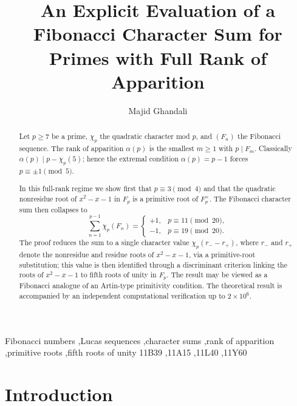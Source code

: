 \documentclass[preprint,5p,times,twocolumn]{elsarticle}
\def\F{F}\def\Z{Z}\def\Q{Q}\def\R{R}\def\N{N}%
\newcommand{\Z}{\mathbb{Z}}
\newcommand{\Q}{\mathbb{Q}}
\newcommand{\R}{\mathbb{R}}
\newcommand{\F}{\mathbb{F}}
\newcommand{\N}{\mathbb{N}}
\begin{document}
\begin{frontmatter}

\title{An Explicit Evaluation of a Fibonacci Character Sum 
for Primes with Full Rank of Apparition}

\author[aff1]{Majid Ghandali}
\address[aff1]{Independent Researcher}

\begin{abstract}
Let $p\ge 7$ be a prime, $\chi_p$ the quadratic character mod $p$, 
and $(F_n)$ the Fibonacci sequence. The rank of apparition 
$\alpha(p)$ is the smallest $m\ge 1$ with $p\mid F_m$. 
Classically $\alpha(p)\mid p-\chi_p(5)$; hence the extremal 
condition $\alpha(p)=p-1$ forces $p\equiv\pm 1\pmod 5$.

In this full-rank regime we show first that $p\equiv 3\pmod 4$ 
and that the quadratic nonresidue root of $x^2-x-1$ in $\F_p$ 
is a primitive root of $\F_p^\times$. The Fibonacci character 
sum then collapses to
\[
\sum_{n=1}^{p-1}\chi_p(F_n)=
\begin{cases}+1,& p\equiv 11\pmod{20},\\
              -1,& p\equiv 19\pmod{20}.\end{cases}
\]
The proof reduces the sum to a single character value 
$\chi_p(r_- - r_+)$, where $r_-$ and $r_+$ denote the 
nonresidue and residue roots of $x^2-x-1$, via a 
primitive-root substitution; this value is then identified 
through a discriminant criterion linking the roots of 
$x^2-x-1$ to fifth roots of unity in $\F_p$. The result may 
be viewed as a Fibonacci analogue of an Artin-type primitivity 
condition. The theoretical result is accompanied by an 
independent computational verification up to $2\times 10^6$.
\end{abstract}

\begin{keyword}
Fibonacci numbers \sep Lucas sequences \sep character sums 
\sep rank of apparition \sep primitive roots \sep fifth roots of unity
\MSC[2020] 11B39 \sep 11A15 \sep 11L40 \sep 11Y60
\end{keyword}

\end{frontmatter}

\section{Introduction}\label{sec:intro}
\end{document}
